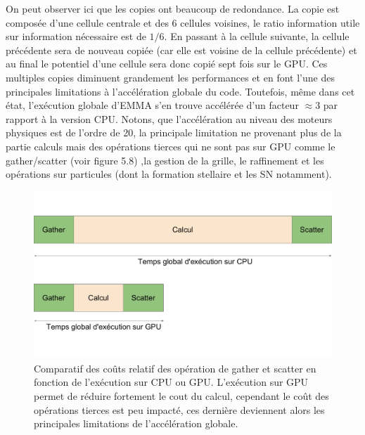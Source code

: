 On peut observer ici que les copies ont beaucoup de redondance.
La copie est composée d'une cellule centrale et des 6 cellules voisines, le ratio information utile sur information nécessaire est de $1/6$.
En passant à la cellule suivante, la cellule précédente sera de nouveau copiée (car elle est voisine de la cellule précédente) et au final le potentiel d'une cellule sera donc copié sept fois sur le \ac{GPU}.
Ces multiples copies diminuent grandement les performances et en font l'une des principales limitations à l'accélération globale du code.
Toutefois, même dans cet état, l'exécution globale d'EMMA s'en trouve accélérée d'un facteur $\approx 3$ par rapport à la version \ac{CPU}.
Notons, que l’accélération au niveau des moteurs physiques est de l’ordre de 20, la principale limitation ne provenant plus de la partie calculs mais des opérations tierces qui ne sont pas sur \ac{GPU} comme le gather/scatter (voir figure 5.8) ,la gestion de la grille, le raffinement et les opérations sur particules  (dont la formation stellaire et les SN notamment).


\begin{figure}
        \includegraphics[width=.95\linewidth]{img/02/gsCPUGPU.pdf} 
        \caption[Comparatif coût CPU et GPU]{Comparatif des coûts relatif des opération de gather et scatter en fonction de l'exécution sur CPU ou GPU.
        L'exécution sur GPU permet de réduire fortement le cout du calcul, cependant le coût des opérations tierces est peu impacté, ces dernière deviennent alors les principales limitations de l'accélération globale.
 		\label{fig:fracgatherscatter}
 		}
\end{figure}


